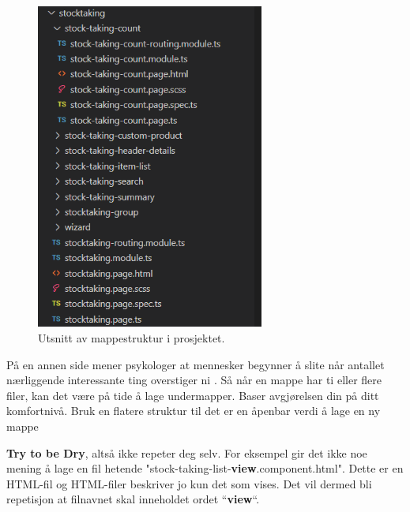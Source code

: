 \begin{figure}
    \centering
    \includegraphics[width=75mm]{figures/Tekniske-valg/Utvikling/folderStructure.PNG}
    \caption{Utsnitt av mappestruktur i prosjektet.}
    \label{mappestruktur}
\end{figure}


På en annen side mener psykologer at mennesker begynner å slite når antallet nærliggende interessante ting overstiger ni \cite{miller1956magical}. 
Så når en mappe har ti eller flere filer, kan det være på tide å lage undermapper. Baser avgjørelsen din på ditt komfortnivå. Bruk en flatere struktur til det er en åpenbar verdi å lage en ny mappe

\textbf{Try to be Dry}, altså ikke repeter deg selv. For eksempel gir det ikke noe mening å lage en fil hetende "stock-taking-list-\textbf{view}.component.html". Dette er en HTML-fil og HTML-filer beskriver jo kun det som vises. Det vil dermed bli repetisjon at filnavnet skal inneholdet ordet ``\textbf{view}``.
